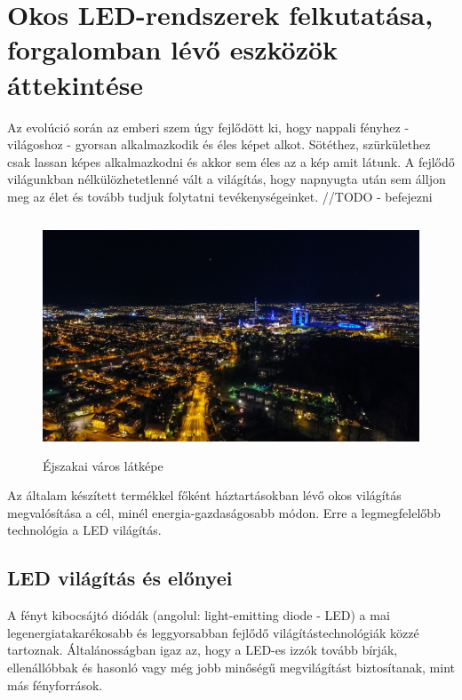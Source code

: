 \documentclass[../main.tex]{subfiles}
\begin{document}
\section{Okos LED-rendszerek felkutatása, forgalomban lévő eszközök áttekintése}
    Az evolúció során az emberi szem úgy fejlődött ki, hogy nappali fényhez - világoshoz - gyorsan alkalmazkodik és éles képet alkot. Sötéthez, szürkülethez csak lassan képes alkalmazkodni és akkor sem éles az a kép amit látunk. A fejlődő világunkban nélkülözhetetlenné vált a világítás, hogy napnyugta után sem álljon meg az élet és tovább tudjuk folytatni tevékenységeinket. //TODO - befejezni
    \begin{figure}[h!] %
        \centering
            \includegraphics[height=7cm]{irodalom_res/night_life.jpg}
        \caption{Éjszakai város látképe} %
    \end{figure}
    
    Az általam készített termékkel főként háztartásokban lévő okos világítás megvalósítása a cél, minél energia-gazdaságosabb módon. Erre a legmegfelelőbb technológia a LED világítás.
    
    \subsection{LED világítás és előnyei} %
    
    A fényt kibocsájtó diódák (angolul: light-emitting diode - LED) a mai legenergiatakarékosabb és leggyorsabban fejlődő világítástechnológiák közzé tartoznak. Általánosságban igaz az, hogy a LED-es izzók tovább bírják, ellenállóbbak és hasonló vagy még jobb minőségű megvilágítást biztosítanak, mint más fényforrások.
    
\end{document}
